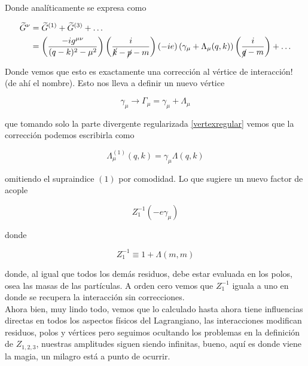 \documentclass[tickz]{article}
\numberwithin{equation}{section}
\begin{document}
Donde analíticamente se expresa como

\begin{equation}\label{key}
\begin{aligned}
\widetilde{G}^{\nu} &= \widetilde{G}^{(1)} + \widetilde{G}^{(3)} + \dots\\
&= \left(\frac{-ig^{\mu\nu}}{(q-k)^2-\mu^2}\right)\left(\frac{i}{\cancel{k}-\cancel{p}-m}\right) (-ie)\left( \gamma_{\mu}  + \Lambda_{\mu}(q,k)\right)\left(\frac{i}{\cancel{q}-m}\right) + \dots
\end{aligned} 
\end{equation}

Donde vemos que esto es exactamente una corrección al vértice de interacción! (de ahí el nombre). Esto nos lleva a definir un nuevo vértice

\begin{equation}\label{key}
\gamma_{\mu} \longrightarrow \Gamma_{\mu}= \gamma_{\mu} + \Lambda_{\mu}
\end{equation}

que tomando solo la parte divergente regularizada \ref{vertexregular} vemos que la corrección podemos escribirla como

\begin{equation}\label{lambdamunu}
\Lambda^{(1)}_{\mu}(q,k) = \gamma_{\mu} \Lambda(q,k)
\end{equation}

omitiendo el supraindice $ (1) $ por comodidad. Lo que sugiere un nuevo factor de acople

\begin{equation}\label{vertexz1}
Z^{-1}_1\left(-e \gamma_{\mu}\right)
\end{equation}

donde

\begin{equation}\label{z1}
Z^{-1}_1 \equiv 1 + \Lambda(m,m)
\end{equation}

donde, al igual que todos los demás residuos, debe estar evaluada en los polos, osea las masas de las partículas. A orden cero vemos que $ Z^{-1}_1 $ iguala a uno en donde se recupera la interacción sin correcciones.\\

Ahora bien, muy lindo todo, vemos que lo calculado hasta ahora tiene influencias directas en todos los aspectos físicos del Lagrangiano, las interacciones modifican residuos, polos y vértices pero seguimos ocultando los problemas en la definición de $ Z_{1,2,3} $, nuestras amplitudes siguen siendo infinitas, bueno, aquí es donde viene la magia, un milagro está a punto de ocurrir.\\
\end{document}
